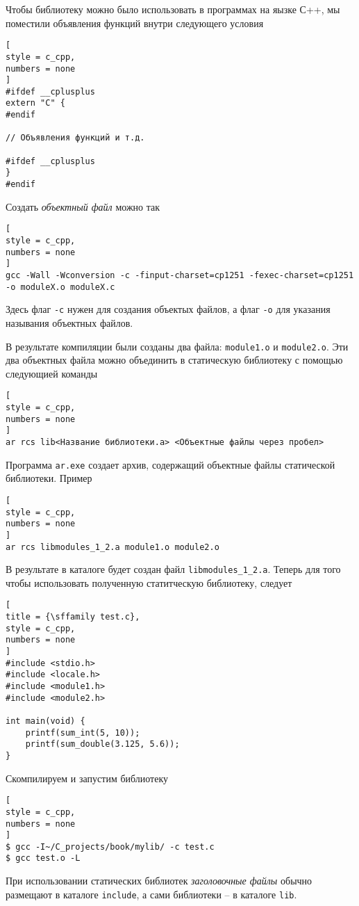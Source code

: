 \documentclass[%
	11pt,
	a4paper,
	utf8,
		]{article}
\begin{document}
Чтобы библиотеку можно было использовать в программах на яызке С++, мы поместили объявления функций внутри следующего условия
\begin{lstlisting}[
style = c_cpp,
numbers = none
]
#ifdef __cplusplus
extern "C" {
#endif

// Объявления функций и т.д.

#ifdef __cplusplus
}
#endif
\end{lstlisting}

Создать \emph{объектный файл} можно так
\begin{lstlisting}[
style = c_cpp,
numbers = none
]
gcc -Wall -Wconversion -c -finput-charset=cp1251 -fexec-charset=cp1251 -o moduleX.o moduleX.c
\end{lstlisting}

Здесь флаг \verb|-c| нужен для создания объектых файлов, а флаг \verb|-o| для указания называния объектных файлов.

В результате компиляции были созданы два файла: \verb|module1.o| и \verb|module2.o|. Эти два объектных файла можно объединить в статическую библиотеку с помощью следующией команды
\begin{lstlisting}[
style = c_cpp,
numbers = none
]
ar rcs lib<Название библиотеки.a> <Объектные файлы через пробел>
\end{lstlisting}

Программа \verb|ar.exe| создает архив, содержащий объектные файлы статической библиотеки. Пример
\begin{lstlisting}[
style = c_cpp,
numbers = none
]
ar rcs libmodules_1_2.a module1.o module2.o
\end{lstlisting}

В результате в каталоге будет создан файл \verb|libmodules_1_2.a|. Теперь для того чтобы использовать полученную статитческую библиотеку, следует
\begin{lstlisting}[
title = {\sffamily test.c},
style = c_cpp,
numbers = none
]
#include <stdio.h>
#include <locale.h>
#include <module1.h>
#include <module2.h>

int main(void) {
    printf(sum_int(5, 10));
    printf(sum_double(3.125, 5.6));
}
\end{lstlisting}

Скомпилируем и запустим библиотеку
\begin{lstlisting}[
style = c_cpp,
numbers = none
]
$ gcc -I~/C_projects/book/mylib/ -c test.c
$ gcc test.o -L
\end{lstlisting}

При использовании статических библиотек \emph{заголовочные файлы} обычно размещают в каталоге \verb|include|, а сами библиотеки -- в каталоге \verb|lib|.
\end{document}
